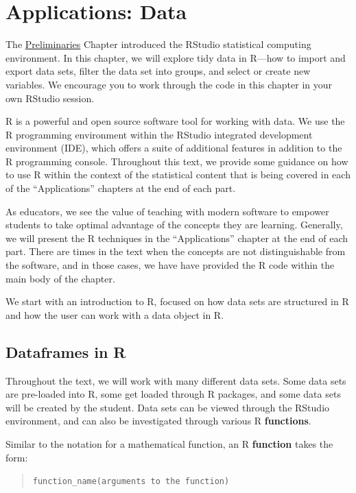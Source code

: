 \documentclass[
  10pt,
  openany]{book}
\theoremstyle{definition}
\theoremstyle{definition}
\theoremstyle{definition}
\theoremstyle{definition}
\theoremstyle{remark}
\begin{document}
\chapter{Applications: Data}\label{data-applications}

The \href{rstudio}{Preliminaries} Chapter introduced the RStudio statistical computing environment.
In this chapter, we will explore tidy data in R---how to import and export data sets,
filter the data set into groups, and select or create new variables.
We encourage you to work through the code in this chapter in
your own RStudio session.

R is a powerful and open source software tool for working with data.
We use the R programming environment within the RStudio integrated
development environment (IDE), which offers a suite of additional features
in addition to the R programming console.
Throughout this text, we provide some guidance on how to use R within the
context of the statistical content that is being covered in each of the
``Applications'' chapters at the end of each part.

As educators, we see the value of teaching with modern software to
empower students to take optimal advantage of the concepts they are learning.
Generally, we will present the R techniques in the ``Applications'' chapter at the
end of each part. There are times in the text when the concepts are not
distinguishable from the software, and in those cases, we have have provided the
R code within the main body of the chapter.

We start with an introduction to R, focused on how data sets are structured in
R and how the user can work with a data object in R.

\section{Dataframes in R}\label{dataframes-in-r}

Throughout the text, we will work with many different data sets. Some data sets
are pre-loaded into R, some get loaded through R packages, and some data sets
will be created by the student. Data sets can be viewed through the RStudio
environment, and can also be investigated through various R \textbf{functions}.

Similar to the notation for a mathematical function, an R \textbf{function} takes the form:

\begin{quote}
\texttt{function\_name(arguments\ to\ the\ function)}
\end{quote}
\end{document}
